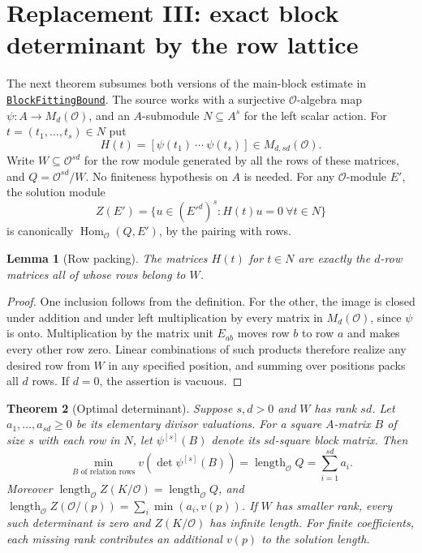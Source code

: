 \documentclass[11pt]{article}
\newtheorem{theorem}{Theorem}[section]
\newtheorem{lemma}[theorem]{Lemma}
\theoremstyle{remark}\newtheorem{remark}[theorem]{Remark}
\newcommand{\Ocal}{\mathcal O}
\newcommand{\len}{\operatorname{length}_{\Ocal}}
\newcommand{\Hom}{\operatorname{Hom}_{\Ocal}}
\newcommand{\src}[2]{\href{https://github.com/VladimirReshetnikov/ProveIt/blob/9050b04000647d588d0c78d945180abcd3b0bcf7/Analysis/GeneralizedRiemannHypothesis/Lean/grh/src/#1}{\texttt{#2}}}
\begin{document}
\section{Replacement III: exact block determinant by the row lattice}
The next theorem subsumes both versions of the main-block estimate in \src{Lib/General/Algebra/BlockFittingBound.lean\#L36}{BlockFittingBound}. The source works with a surjective $\Ocal$-algebra map $\psi:A\to M_d(\Ocal)$, and an $A$-submodule $N\subseteq A^s$ for the left scalar action. For $t=(t_1,\ldots,t_s)\in N$ put
\[
 H(t)=[\psi(t_1)\ \cdots\ \psi(t_s)]\in M_{d,sd}(\Ocal).
\]
Write $W\subseteq\Ocal^{sd}$ for the row module generated by all the rows of these matrices, and $Q=\Ocal^{sd}/W$. No finiteness hypothesis on $A$ is needed. For any $\Ocal$-module $E'$, the solution module
\[
 Z(E')=\{u\in(E'^d)^s: H(t)u=0\ \forall t\in N\}
\]
is canonically $\Hom(Q,E')$, by the pairing with rows.
\begin{lemma}[Row packing]\label{lem:packing}
The matrices $H(t)$ for $t\in N$ are exactly the $d$-row matrices all of whose rows belong to $W$.
\end{lemma}
\begin{proof}
One inclusion follows from the definition. For the other, the image is closed under addition and under left multiplication by every matrix in $M_d(\Ocal)$, since $\psi$ is onto. Multiplication by the matrix unit $E_{ab}$ moves row $b$ to row $a$ and makes every other row zero. Linear combinations of such products therefore realize any desired row from $W$ in any specified position, and summing over positions packs all $d$ rows. If $d=0$, the assertion is vacuous.
\end{proof}
\begin{theorem}[Optimal determinant]\label{thm:block}
Suppose $s,d>0$ and $W$ has rank $sd$. Let $a_1,\ldots,a_{sd}\ge0$ be its elementary divisor valuations. For a square $A$-matrix $B$ of size $s$ with each row in $N$, let $\psi^{[s]}(B)$ denote its $sd$-square block matrix. Then
\[
 \min_{B\text{ of relation rows}}v(\det\psi^{[s]}(B))
 =\len Q=\sum_{i=1}^{sd}a_i.
\]
Moreover $\len Z(K/\Ocal)=\len Q$, and $\len Z(\Ocal/(p))=\sum_i\min(a_i,v(p))$. If $W$ has smaller rank, every such determinant is zero and $Z(K/\Ocal)$ has infinite length. For finite coefficients, each missing rank contributes an additional $v(p)$ to the solution length.
\end{theorem}
\end{document}
